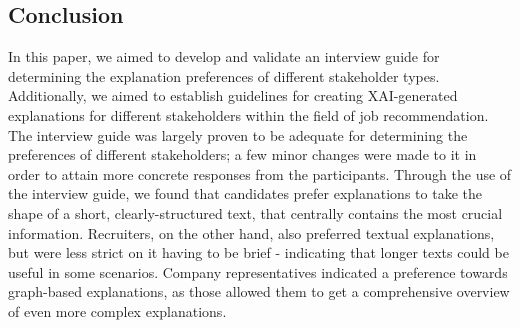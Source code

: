 \subsection{Conclusion}
In this paper, we aimed to develop and validate an interview guide for determining the explanation preferences of different stakeholder types. Additionally, we aimed to establish guidelines for creating XAI-generated explanations for different stakeholders within the field of job recommendation. The interview guide was largely proven to be adequate for determining the preferences of different stakeholders; a few minor changes were made to it in order to attain more concrete responses from the participants. Through the use of the interview guide, we found that candidates prefer explanations to take the shape of a short, clearly-structured text, that centrally contains the most crucial information. Recruiters, on the other hand, also preferred textual explanations, but were less strict on it having to be brief - indicating that longer texts could be useful in some scenarios. Company representatives indicated a preference towards graph-based explanations, as those allowed them to get a comprehensive overview of even more complex explanations. 